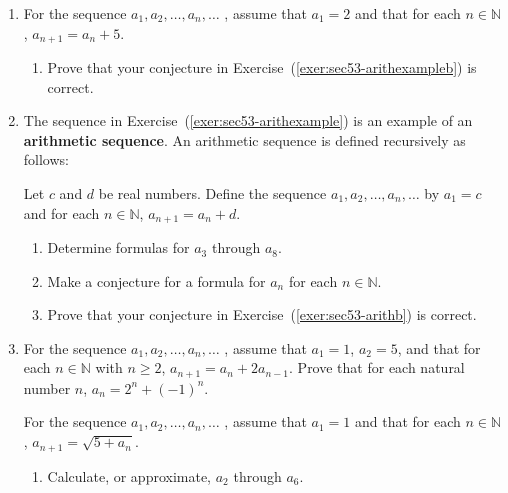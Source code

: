 \begin{enumerate}
\item For the sequence $a_1 ,a_2 , \ldots ,a_n , \ldots $ , assume that  $a_1  = 2$ and that for each  $n \in \mathbb{N}$,  $a_{n + 1}  = a_n + 5$. \label{exer:sec53-arithexample}
\begin{enumerate}
  \yitem Calculate  $a_2 $  through  $a_6$.

  \yitem Make a conjecture for a formula for  $a_n $ for each  $n \in \mathbb{N}$. 
\label{exer:sec53-arithexampleb}

  \item Prove that your conjecture in Exercise~(\ref{exer:sec53-arithexampleb}) is correct.
\end{enumerate}



\item \label{exer:sec53-arith}The sequence in Exercise~(\ref{exer:sec53-arithexample}) is an example of an 
\textbf{arithmetic sequence}.  
%
%
An arithmetic sequence is defined recursively as follows:

Let $c$ and $d$ be real numbers.  Define the sequence $a_1 ,a_2 , \ldots ,a_n , \ldots $ by  $a_1  = c$ and for each  $n \in \mathbb{N}$,  $a_{n + 1}  = a_n + d$.
\begin{enumerate}
  \item Determine formulas for  $a_3 $  through  $a_8 $.

  \item Make a conjecture for a formula for  $a_n$ for each  $n \in \mathbb{N}$. \label{exer:sec53-arithb}

  \item Prove that your conjecture in Exercise~(\ref{exer:sec53-arithb}) is correct.
\end{enumerate}


\item For the sequence   $a_1 ,a_2 , \ldots ,a_n , \ldots $ , assume that  $a_1  = 1$, $a_2 = 5$, and that for each  $n \in \mathbb{N}$ with $n\geq 2$,  $a_{n + 1}  = a_n + 2a_{n-1}$.  Prove that for each natural number $n$, 
$a_n = 2^n + (-1)^n$.


\xitem For the sequence   $a_1 ,a_2 , \ldots ,a_n , \ldots $ , assume that  $a_1  = 1$ and that for each  $n \in \mathbb{N}$,  $a_{n + 1}  = \sqrt {5 + a_n } $. \label{exer:sec53-5}

\begin{enumerate}
  \item Calculate, or approximate,  $a_2 $  through  $a_6 $.


\end{enumerate}
\end{enumerate}

